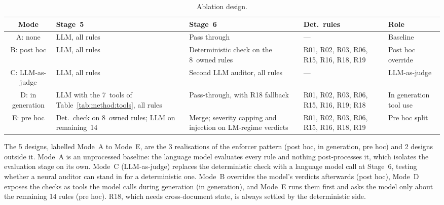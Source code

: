 \begin{table}[htbp]
\centering
\caption{Ablation design.}
\label{tab:method:ablation}
\footnotesize
\begin{adjustbox}{max width=\textwidth}
\begin{tabular}{@{}cp{3.8cm}p{3.8cm}p{3.6cm}p{2.2cm}@{}}
\toprule
\textbf{Mode} & \textbf{Stage~5} & \textbf{Stage~6} & \textbf{Det.\ rules} & \textbf{Role} \\
\midrule
A: none          & LLM, all rules                                    & Pass through                              & ---                                          & Baseline              \\[6pt]
B: post hoc      & LLM, all rules                                    & Deterministic check on the 8~owned rules  & R01, R02, R03, R06, R15, R16, R18, R19       & Post hoc override     \\[6pt]
C: LLM-as-judge  & LLM, all rules                                    & Second LLM auditor, all rules             & ---                                          & LLM-as-judge          \\[6pt]
D: in generation & LLM with the 7~tools of Table~\ref{tab:method:tools}, all rules & Pass-through, with R18 fallback  & R01, R02, R03, R06, R15, R16, R19; R18       & In generation tool use \\[6pt]
E: pre hoc       & Det.\ check on 8~owned rules; LLM on remaining~14 & Merge; severity capping and injection on LM-regime verdicts & R01, R02, R03, R06, R15, R16, R18, R19 & Pre hoc split \\
\bottomrule
\end{tabular}
\end{adjustbox}
\end{table}

The 5 designs, labelled Mode~A to Mode~E, are the 3 realisations of the enforcer pattern (post hoc, in generation, pre hoc) and 2 designs outside it. Mode~A is an unprocessed baseline: the language model evaluates every rule and nothing post-processes it, which isolates the evaluation stage on its own. Mode~C (LLM-as-judge) replaces the deterministic check with a language model call at Stage~6, testing whether a neural auditor can stand in for a deterministic one. Mode~B overrides the model's verdicts afterwards (post hoc), Mode~D exposes the checks as tools the model calls during generation (in generation), and Mode~E runs them first and asks the model only about the remaining 14 rules (pre hoc). R18, which needs cross-document state,  is always settled by the deterministic side.

